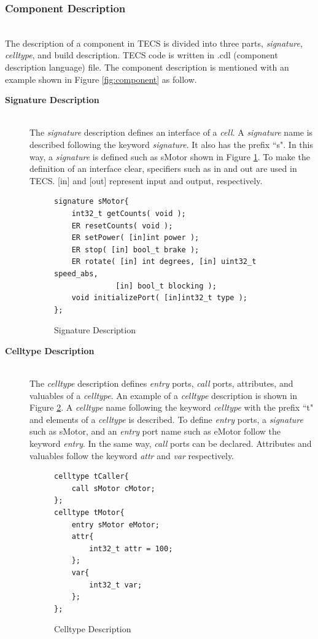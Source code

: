 \documentclass[conference,compsoc]{IEEEtran}
\begin{document}
\subsubsection{Component Description}\mbox{}\\

The description of a component in TECS is divided into three parts, {\it signature}, {\it celltype}, and build description.
TECS code is written in .cdl (component description language) file.
The component description is mentioned with an example shown in Figure \ref{fig:component} as follow.

\begin{description}
    \item[{\bf Signature Description}]\mbox{}\\
        The {\it signature} description defines an interface of a {\it cell}.
        A {\it signature} name is described following the keyword {\it signature}.
        It also has the prefix ``s".
        In this way, a {\it signature} is defined such as sMotor shown in Figure \ref{signature}.
        To make the definition of an interface clear, specifiers such as in and out are used in TECS.
        [in] and [out] represent input and output, respectively.\\
\begin{figure}[t]
\centering
\begin{lstlisting}
signature sMotor{
    int32_t getCounts( void );
    ER resetCounts( void );
    ER setPower( [in]int power );
    ER stop( [in] bool_t brake );
    ER rotate( [in] int degrees, [in] uint32_t speed_abs,
              [in] bool_t blocking );
    void initializePort( [in]int32_t type );
};
\end{lstlisting}
\caption{Signature Description}
\label{signature}
\end{figure}

    \item[{\bf Celltype Description}]\mbox{}\\
        The {\it celltype} description defines {\it entry} ports, {\it call} ports, attributes, and valuables of a {\it celltype}.
        An example of a {\it celltype} description is shown in Figure \ref{celltype}.
        A {\it celltype} name following the keyword {\it celltype} with the prefix ``t" and elements of a {\it celltype} is described.
        To define {\it entry} ports, a {\it signature} such as sMotor, and an {\it entry} port name such as eMotor follow the keyword {\it entry}.
        In the same way, {\it call} ports can be declared.
        Attributes and valuables follow the keyword {\it attr} and {\it var} respectively.\\
\begin{figure}[t]
\centering
\begin{lstlisting}
celltype tCaller{
    call sMotor cMotor;
};
celltype tMotor{
    entry sMotor eMotor;
    attr{
        int32_t attr = 100;
    };
    var{
        int32_t var;
    };
};
\end{lstlisting}
\caption{Celltype Description}
\label{celltype}
\end{figure}


\end{description}
\end{document}
